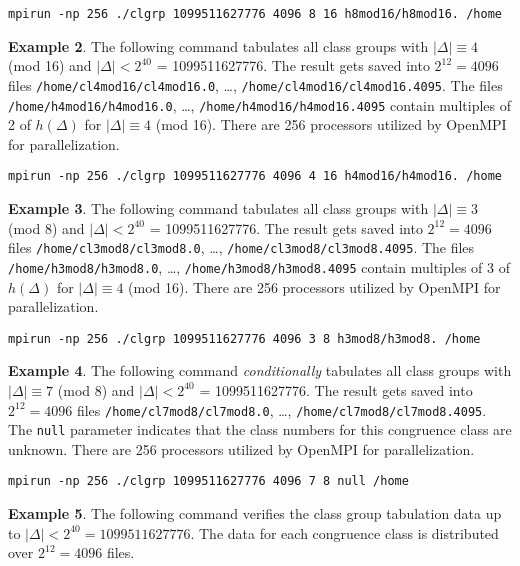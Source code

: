 \documentclass[a4paper,10pt]{article}
\newcommand{\code}{\lstinline}
\begin{document}
\begin{lstlisting}
mpirun -np 256 ./clgrp 1099511627776 4096 8 16 h8mod16/h8mod16. /home
\end{lstlisting}

\textbf{Example 2}. The following command tabulates all class groups with $|\Delta| \equiv 4$ (mod 16) and \mbox{$|\Delta| < 2^{40}$} = 1099511627776. The result gets saved into $2^{12}=4096$ files \code{/home/cl4mod16/cl4mod16.0}, \ldots, \code{/home/cl4mod16/cl4mod16.4095}. The files \code{/home/h4mod16/h4mod16.0}, \ldots, \code{/home/h4mod16/h4mod16.4095} contain multiples of 2 of $h(\Delta)$ for $|\Delta| \equiv 4$ (mod 16). There are 256 processors utilized by OpenMPI for parallelization.

\begin{lstlisting}
mpirun -np 256 ./clgrp 1099511627776 4096 4 16 h4mod16/h4mod16. /home
\end{lstlisting}

\textbf{Example 3}. The following command tabulates all class groups with $|\Delta| \equiv 3$ (mod 8) and \mbox{$|\Delta| < 2^{40}$} = 1099511627776. The result gets saved into $2^{12}=4096$ files \code{/home/cl3mod8/cl3mod8.0}, \ldots, \code{/home/cl3mod8/cl3mod8.4095}. The files \code{/home/h3mod8/h3mod8.0}, \ldots, \code{/home/h3mod8/h3mod8.4095} contain multiples of 3 of $h(\Delta)$ for $|\Delta| \equiv 4$ (mod 16). There are 256 processors utilized by OpenMPI for parallelization.

\begin{lstlisting}
mpirun -np 256 ./clgrp 1099511627776 4096 3 8 h3mod8/h3mod8. /home
\end{lstlisting}

\textbf{Example 4}. The following command \emph{conditionally} tabulates all class groups with $|\Delta| \equiv 7$ (mod 8) and \mbox{$|\Delta| < 2^{40}$} = 1099511627776. The result gets saved into $2^{12}=4096$ files \code{/home/cl7mod8/cl7mod8.0}, \ldots, \code{/home/cl7mod8/cl7mod8.4095}. The \code{null} parameter indicates that the class numbers for this congruence class are unknown. There are 256 processors utilized by OpenMPI for parallelization.

\begin{lstlisting}
mpirun -np 256 ./clgrp 1099511627776 4096 7 8 null /home
\end{lstlisting}

\textbf{Example 5}. The following command verifies the class group tabulation data up to $|\Delta| < 2^{40} = 1099511627776$. The data for each congruence class is distributed over $2^{12} = 4096$ files.
\end{document}
